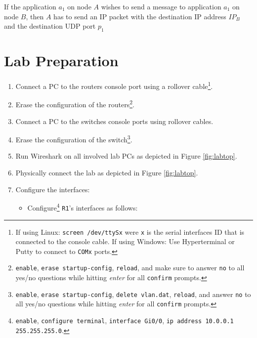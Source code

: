 \documentclass[pdftex,12pt,a4paper]{article}
\begin{document}
        If the application $a_1$ on node $A$ wishes to send a message to
        application $a_1$ on node $B$, then $A$ has to send an IP packet with
        the destination IP address $IP_B$ and the destination UDP port $p_1$


    \section{Lab Preparation}
        \begin{enumerate}
            \item Connect a PC to the routers console port using a rollover
                cable\footnote{If using Linux: \texttt{screen /dev/ttySx} were
                \texttt{x} is the
                serial interfaces ID that is connected to the console
                cable. If using Windows: Use Hyperterminal or Putty to
                connect to \texttt{COMx} ports.}.
            \item Erase the configuration of the
                routers\footnote{\texttt{enable}, \texttt{erase
                startup-config}, \texttt{reload}, and make sure to answer
                \texttt{no} to all yes/no questions while hitting
                \emph{enter} for all \texttt{confirm} prompts.}.
            \item Connect a PC to the switches console ports using rollover
                cables.
            \item Erase the configuration of the
                switch\footnote{\texttt{enable}, \texttt{erase startup-config},
                \texttt{delete vlan.dat}, \texttt{reload}, and answer
                \texttt{no} to all yes/no questions while hitting
                \emph{enter} for all \texttt{confirm} prompts.}.
            \item Run Wireshark on all involved lab PCs as depicted in Figure
                \ref{fig:labtop}.
            \item Physically connect the lab as depicted in Figure \ref{fig:labtop}.
            \item Configure the interfaces:
                \begin{itemize}
                    \item Configure\footnote{\texttt{enable}, \texttt{configure
                        terminal}, \texttt{interface Gi0/0}, \texttt{ip address
                        10.0.0.1 255.255.255.0}.} \texttt{R1}'s interfaces as follows:
                        \begin{itemize}

\end{itemize}
\end{itemize}
\end{enumerate}
\end{document}
